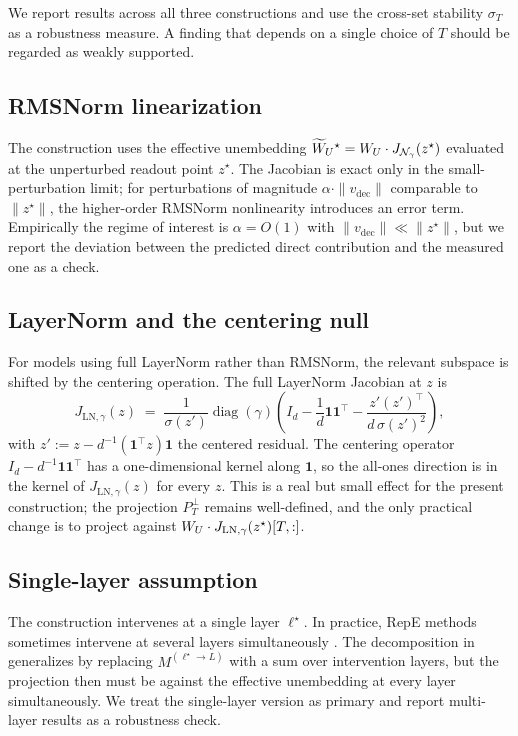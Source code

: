 \documentclass[11pt,letterpaper]{article}
\theoremstyle{plain}
\theoremstyle{definition}
\DeclareMathOperator{\diag}{diag}
\newcommand{\1}{\mathbf{1}}
\newcommand{\WU}{W_{U}\mathchoice{}{}{}{}}
\newcommand{\WUt}{\widetilde{W}_{U}\mathchoice{}{}{}{}}
\newcommand{\vdec}{v_{\text{dec}}}
\newcommand{\PTperp}{P_{T}^{\perp}}
\begin{document}
We report results across all three constructions and use the cross-set stability $\sigma_T$ as a robustness measure. A finding that depends on a single choice of $T$ should be regarded as weakly supported.

\subsection{RMSNorm linearization}

The construction uses the effective unembedding $\WUt^\star = \WU \cdot J_{\mathcal{N}_\gamma}(z^\star)$ evaluated at the unperturbed readout point $z^\star$. The Jacobian is exact only in the small-perturbation limit; for perturbations of magnitude $\alpha \cdot \|\vdec\|$ comparable to $\|z^\star\|$, the higher-order RMSNorm nonlinearity introduces an error term. Empirically the regime of interest is $\alpha = O(1)$ with $\|\vdec\| \ll \|z^\star\|$, but we report the deviation between the predicted direct contribution and the measured one as a check.

\subsection{LayerNorm and the centering null}

For models using full LayerNorm rather than RMSNorm, the relevant subspace is shifted by the centering operation. The full LayerNorm Jacobian at $z$ is
\begin{equation}
J_{\text{LN}, \gamma}(z) \;=\; \frac{1}{\sigma(z')}\diag(\gamma)\left(I_d - \frac{1}{d}\1\1^\top - \frac{z'(z')^\top}{d\,\sigma(z')^2}\right),
\label{eq:lnjacobian}
\end{equation}
with $z' := z - d^{-1}(\1^\top z)\1$ the centered residual. The centering operator $I_d - d^{-1}\1\1^\top$ has a one-dimensional kernel along $\1$, so the all-ones direction is in the kernel of $J_{\text{LN}, \gamma}(z)$ for every $z$. This is a real but small effect for the present construction; the projection $\PTperp$ remains well-defined, and the only practical change is to project against $\WU \cdot J_{\text{LN}, \gamma}(z^\star)[T,:]$.

\subsection{Single-layer assumption}

The construction intervenes at a single layer $\ell^\star$. In practice, RepE methods sometimes intervene at several layers simultaneously \cite{zou2023repe}. The decomposition in  generalizes by replacing $M^{(\ell^\star \to L)}$ with a sum over intervention layers, but the projection then must be against the effective unembedding at every layer simultaneously. We treat the single-layer version as primary and report multi-layer results as a robustness check.
\end{document}
